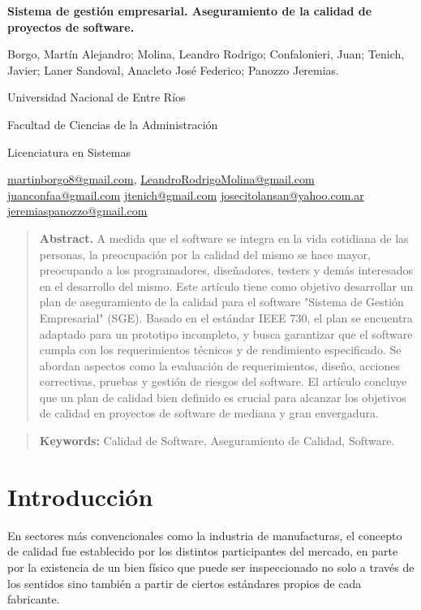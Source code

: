 \documentclass[a4paper,10pt]{article}
\begin{document}
	\centering
	{\fontsize{14}{17}\bfseries Sistema de gestión empresarial. Aseguramiento de la calidad de proyectos de software.\par}
	{\small Borgo, Martín Alejandro; Molina, Leandro Rodrigo; Confalonieri, Juan; Tenich, Javier; Laner Sandoval, Anacleto José Federico; Panozzo Jeremias.\par}
	{\normalsize Universidad Nacional de Entre Ríos\par}
	{\normalsize Facultad de Ciencias de la Administración\par}
	{\normalsize Licenciatura en Sistemas\par}
	{\small
		\href{mailto:martinborgo8@gmail.com}{martinborgo8@gmail.com},
		\href{mailto:LeandroRodrigoMolina@gmail.com}{LeandroRodrigoMolina@gmail.com}
		\href{mailto:juanconfaa@gmail.com}{juanconfaa@gmail.com}
		\href{mailto:jtenich@gmail.com}{jtenich@gmail.com}
		\href{mailto:josecitolansan@yahoo.com.ar}{josecitolansan@yahoo.com.ar}
		\href{mailto:jeremiaspanozzo@gmail.com}{jeremiaspanozzo@gmail.com}
		\par}	
	{\begin{quote} \small \justify\textbf{Abstract.} A medida que el software se integra en la vida cotidiana de las personas, la preocupación por la calidad del mismo se hace mayor, preocupando a los programadores, diseñadores, testers y demás interesados en el desarrollo del mismo. Este artículo tiene como objetivo desarrollar un plan de aseguramiento de la calidad para el software "Sistema de Gestión Empresarial" (SGE). Basado en el estándar IEEE 730, el plan se encuentra adaptado para un prototipo incompleto, y busca garantizar que el software cumpla con los requerimientos técnicos y de rendimiento especificado. Se abordan aspectos como la evaluación de requerimientos, diseño, acciones correctivas, pruebas y gestión de riesgos del software. El artículo concluye que un plan de calidad bien definido es crucial para alcanzar los objetivos de calidad en proyectos de software de mediana y gran envergadura. \end{quote} \par}
	{\begin{quote} \small \justify\textbf{Keywords:} Calidad de Software, Aseguramiento de Calidad, Software.\end{quote} \par}
	
	\justifying
	
	\section{Introducción}
	En sectores más convencionales como la industria de manufacturas, el concepto de calidad fue establecido por los distintos participantes del mercado, en parte por la existencia de un bien físico que puede ser inspeccionado no solo a través de los sentidos sino también a partir de ciertos estándares propios de cada fabricante.
	
\end{document}
